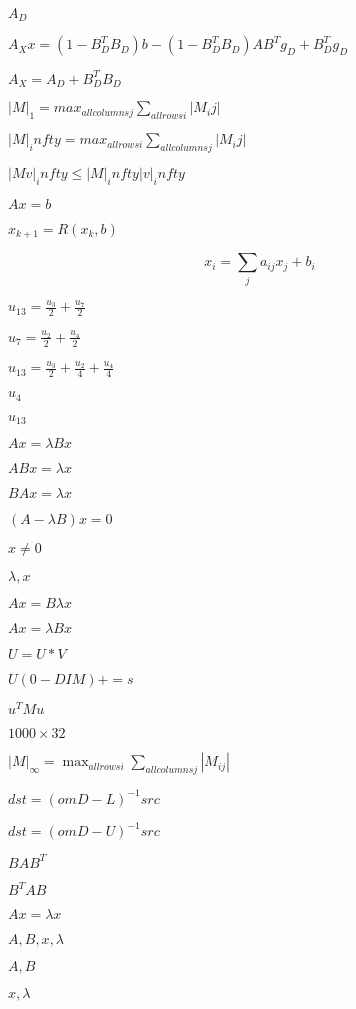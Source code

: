 \documentclass{article}
\begin{document}
$A_D$
\pagebreak

$A_X x = (1 - B_D^T B_D)b - (1 - B_D^T B_D) A B^T g_D + B_D^T g_D$
\pagebreak

$A_X = A_D + B_D^T B_D$
\pagebreak

$|M|_1=max_{all columns j}\sum_{all rows i} |M_ij|$
\pagebreak

$|M|_infty=max_{all rows i}\sum_{all columns j} |M_ij|$
\pagebreak

$|Mv|_infty \leq |M|_infty |v|_infty$
\pagebreak

$Ax = b$
\pagebreak

$x_{k+1} = R(x_k,b)$
\pagebreak

\[ x_i = \sum_j a_{ij} x_j + b_i \]
\pagebreak

$u_{13} = \frac{u_3}{2} + \frac{u_7}{2}$
\pagebreak

$u_{7} = \frac{u_2}{2} + \frac{u_4}{2}$
\pagebreak

$u_{13} = \frac{u_3}{2} + \frac{u_2}{4} + \frac{u_4}{4}$
\pagebreak

$u_4$
\pagebreak

$u_{13}$
\pagebreak

$Ax=\lambda B x$
\pagebreak

$ABx=\lambda x$
\pagebreak

$BAx=\lambda x$
\pagebreak

$(A-\lambda B)x=0$
\pagebreak

$x\neq0$
\pagebreak

$\lambda, x$
\pagebreak

$Ax=B\lambda x$
\pagebreak

$A x=\lambda B x$
\pagebreak

$U = U * V$
\pagebreak

$U(0-DIM)+=s$
\pagebreak

$u^T M u$
\pagebreak

$1000\times32$
\pagebreak

$|M|_\infty=\max_{all rows i}\sum_{all columns j} |M_{ij}|$
\pagebreak

$dst = (om D - L)^{-1} src$
\pagebreak

$dst = (om D - U)^{-1} src$
\pagebreak

$B A B^T$
\pagebreak

$B^T A B$
\pagebreak

$Ax=\lambda x$
\pagebreak

$A, B, x, \lambda$
\pagebreak

$A, B$
\pagebreak

$x, \lambda$
\pagebreak
\end{document}
